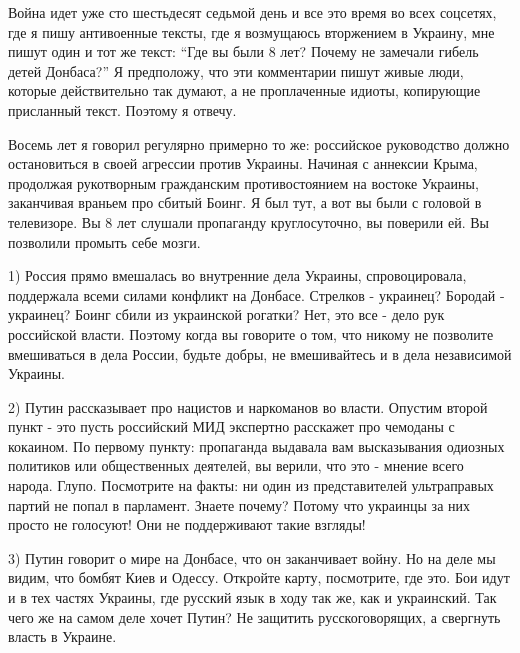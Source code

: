  
 
 
 
 

Война идет уже сто шестьдесят седьмой день и все это время во всех соцсетях,
где я пишу антивоенные тексты, где я возмущаюсь вторжением в Украину, мне пишут
один и тот же текст: \enquote{Где вы были 8 лет? Почему не замечали гибель детей
Донбаса?} Я предположу, что эти комментарии пишут живые люди, которые
действительно так думают, а не проплаченные идиоты, копирующие присланный
текст. Поэтому я отвечу.

Восемь лет я говорил регулярно примерно то же: российское руководство должно
остановиться в своей агрессии против Украины. Начиная с аннексии Крыма,
продолжая рукотворным гражданским противостоянием на востоке Украины,
заканчивая враньем про сбитый Боинг. Я был тут, а вот вы были с головой в
телевизоре. Вы 8 лет слушали пропаганду круглосуточно, вы поверили ей. Вы
позволили промыть себе мозги.

1) Россия прямо вмешалась во внутренние дела Украины, спровоцировала,
поддержала всеми силами конфликт на Донбасе. Стрелков - украинец? Бородай -
украинец? Боинг сбили из украинской рогатки? Нет, это все - дело рук российской
власти. Поэтому когда вы говорите о том, что никому не позволите вмешиваться в
дела России, будьте добры, не вмешивайтесь и в дела независимой Украины.

2) Путин рассказывает про нацистов и наркоманов во власти. Опустим второй пункт
- это пусть российский МИД экспертно расскажет про чемоданы с кокаином. По
первому пункту: пропаганда выдавала вам высказывания одиозных политиков или
общественных деятелей, вы верили, что это - мнение всего народа. Глупо.
Посмотрите на факты: ни один из представителей ультраправых партий не попал в
парламент. Знаете почему? Потому что украинцы за них просто не голосуют! Они не
поддерживают такие взгляды!

3) Путин говорит о мире на Донбасе, что он заканчивает войну. Но на деле мы
видим, что бомбят Киев и Одессу. Откройте карту, посмотрите, где это. Бои идут
и в тех частях Украины, где русский язык в ходу так же, как и украинский. Так
чего же на самом деле хочет Путин? Не защитить русскоговорящих, а свергнуть
власть в Украине.


